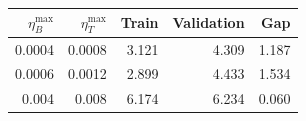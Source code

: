 \begin{tabular}{rrrrr}
\toprule
$\eta_B^{\max}$ & $\eta_T^{\max}$ & Train & Validation & Gap \\
\midrule
0.0004 & 0.0008 & 3.121 & 4.309 & 1.187 \\
0.0006 & 0.0012 & 2.899 & 4.433 & 1.534 \\
0.004 & 0.008 & 6.174 & 6.234 & 0.060 \\
\bottomrule
\end{tabular}
